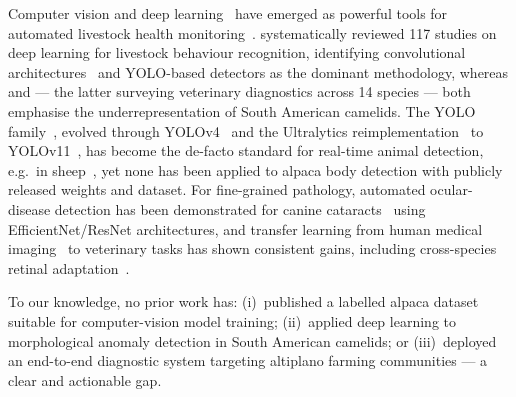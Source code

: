 \documentclass[journal=animals,article=article,submit=mdpi,moreauthors=true,pdftex]{mdpi}
\begin{document}
Computer vision and deep learning~\cite{lecun2015,goodfellow2016} have emerged as
powerful tools for automated livestock health monitoring~\cite{kamilaris2018,neethirajan2020}.
\citet{ali2023} systematically reviewed 117 studies on deep learning for livestock
behaviour recognition, identifying convolutional architectures~\cite{krizhevsky2012,simonyan2015,he2016}
and YOLO-based detectors as the dominant methodology, whereas \citet{giraldo2021} and
\citet{xiao2025} --- the latter surveying veterinary diagnostics across 14 species ---
both emphasise the underrepresentation of South American camelids. The YOLO
family~\cite{redmon2016}, evolved through YOLOv4~\cite{bochkovskiy2020} and the Ultralytics
reimplementation~\cite{jocher2023} to YOLOv11~\cite{ultralytics2024}, has become the
de-facto standard for real-time animal detection, e.g.\ in sheep~\cite{kong2022sheep}, yet
none has been applied to alpaca body detection with publicly released weights and dataset.
For fine-grained pathology, automated ocular-disease detection has been demonstrated for
canine cataracts~\cite{mdpi2025canine} using EfficientNet/ResNet architectures, and
transfer learning from human medical imaging~\cite{gulshan2016,ting2017} to veterinary
tasks has shown consistent gains, including cross-species retinal
adaptation~\cite{esteva2017,mdpi2025canine}.

To our knowledge, no prior work has: (i)~published a labelled alpaca dataset suitable for
computer-vision model training; (ii)~applied deep learning to morphological anomaly
detection in South American camelids; or (iii)~deployed an end-to-end diagnostic system
targeting altiplano farming communities --- a clear and actionable gap.
\end{document}
